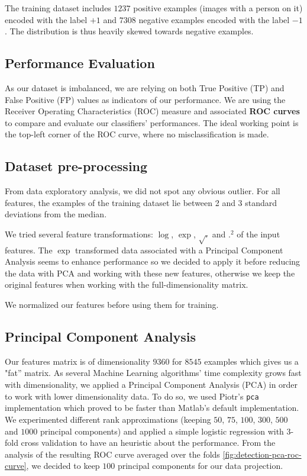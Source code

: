 \documentclass[10pt,a4paper]{article}
\begin{document}
  The training dataset includes $1237$ positive examples (images with a person on it) encoded with the label $+1$ and $7308$ negative examples encoded with the label $-1$. The distribution is thus heavily skewed towards negative examples.

  \subsection{Performance Evaluation}
  As our dataset is imbalanced, we are relying on both True Positive (TP) and False Positive (FP) values as indicators of our performance. We are using the Receiver Operating Characteristics (ROC) measure and associated \textbf{ROC curves} \cite{rocanalysis} to compare and evaluate our classifiers' performances. The ideal working point is the top-left corner of the ROC curve, where no misclassification is made.

  \subsection{Dataset pre-processing}
  From data exploratory analysis, we did not spot any obvious outlier. For all features, the examples of the training dataset lie between 2 and 3 standard deviations from the median.

  We tried several feature transformations: $\log$, $\exp$, $\sqrt{.}$ and $.^2$ of the input features. The $\exp$ transformed data associated with a Principal Component Analysis seems to enhance performance so we decided to apply it before reducing the data with PCA and working with these new features, otherwise we keep the original features when working with the full-dimensionality matrix.

  We normalized our features before using them for training.

  \subsection{Principal Component Analysis}
  Our features matrix is of dimensionality $9360$ for $8545$ examples which gives us a "fat'' matrix. As several Machine Learning algorithms' time complexity grows fast with dimensionality, we applied a Principal Component Analysis (PCA) in order to work with lower dimensionality data. To do so, we used Piotr's \texttt{pca} implementation which proved to be faster than Matlab's default implementation. We experimented different rank approximations (keeping $50$, $75$, $100$, $300$, $500$ and $1000$ principal components) and applied a simple logistic regression with 3-fold cross validation to have an heuristic about the performance. From the analysis of the resulting ROC curve averaged over the folds \ref{fig:detection-pca-roc-curve}, we decided to keep $100$ principal components for our data projection. 
  
\end{document}
